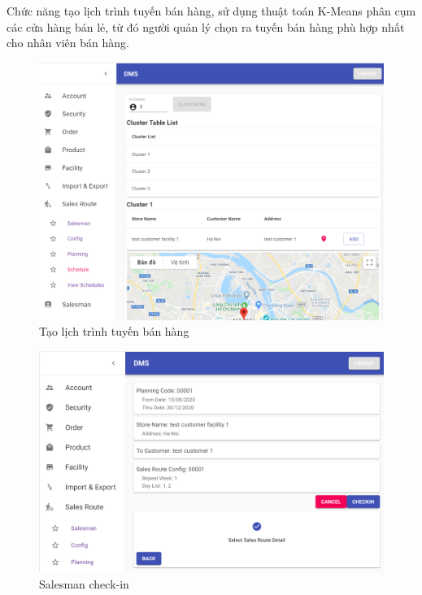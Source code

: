 Chức năng tạo lịch trình tuyến bán hàng, sử dụng thuật toán
K-Means phân cụm các cửa hàng bán lẻ, từ đó người quản lý
chọn ra tuyến bán hàng phù hợp nhất cho nhân viên bán hàng.
\begin{figure}[H]
\centering
\includegraphics[width=15cm]{images/demo/add-schedule.png}
\caption{Tạo lịch trình tuyến bán hàng}
\end{figure}

\begin{figure}[H]
\centering
\includegraphics[width=15cm]{images/demo/salesman-checkin.png}
\caption{Salesman check-in}
\end{figure}
